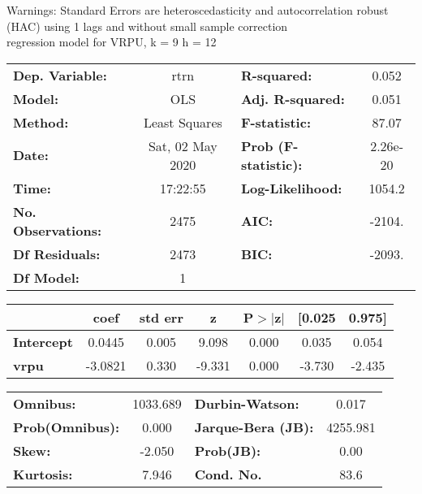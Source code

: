Warnings: \newline
 [1] Standard Errors are heteroscedasticity and autocorrelation robust (HAC) using 1 lags and without small sample correction\\ 

regression model for VRPU, k = 9 h = 12\begin{center}
\begin{tabular}{lclc}
\toprule
\textbf{Dep. Variable:}    &       rtrn       & \textbf{  R-squared:         } &     0.052   \\
\textbf{Model:}            &       OLS        & \textbf{  Adj. R-squared:    } &     0.051   \\
\textbf{Method:}           &  Least Squares   & \textbf{  F-statistic:       } &     87.07   \\
\textbf{Date:}             & Sat, 02 May 2020 & \textbf{  Prob (F-statistic):} &  2.26e-20   \\
\textbf{Time:}             &     17:22:55     & \textbf{  Log-Likelihood:    } &    1054.2   \\
\textbf{No. Observations:} &        2475      & \textbf{  AIC:               } &    -2104.   \\
\textbf{Df Residuals:}     &        2473      & \textbf{  BIC:               } &    -2093.   \\
\textbf{Df Model:}         &           1      & \textbf{                     } &             \\
\bottomrule
\end{tabular}
\begin{tabular}{lcccccc}
                   & \textbf{coef} & \textbf{std err} & \textbf{z} & \textbf{P$> |$z$|$} & \textbf{[0.025} & \textbf{0.975]}  \\
\midrule
\textbf{Intercept} &       0.0445  &        0.005     &     9.098  &         0.000        &        0.035    &        0.054     \\
\textbf{vrpu}      &      -3.0821  &        0.330     &    -9.331  &         0.000        &       -3.730    &       -2.435     \\
\bottomrule
\end{tabular}
\begin{tabular}{lclc}
\textbf{Omnibus:}       & 1033.689 & \textbf{  Durbin-Watson:     } &    0.017  \\
\textbf{Prob(Omnibus):} &   0.000  & \textbf{  Jarque-Bera (JB):  } & 4255.981  \\
\textbf{Skew:}          &  -2.050  & \textbf{  Prob(JB):          } &     0.00  \\
\textbf{Kurtosis:}      &   7.946  & \textbf{  Cond. No.          } &     83.6  \\
\bottomrule
\end{tabular}
\end{center}

